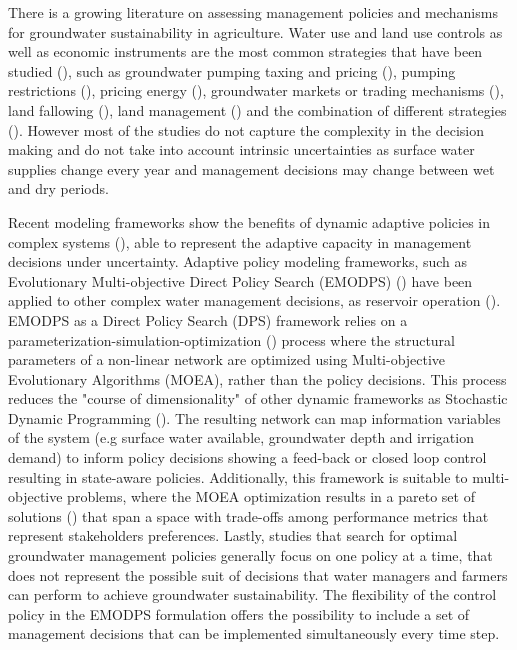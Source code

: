 \documentclass[11pt,a4paper]{article}
\begin{document}
There is a growing literature on assessing management policies and mechanisms for groundwater sustainability in agriculture. Water use and land use controls as well as economic instruments are the most common strategies that have been studied (\cite{clifton_water_2010}), such as groundwater pumping taxing and pricing (\cite{madani_exogenous_2013,mulligan_assessing_2014,stone_economic_2022}), pumping restrictions (\cite{young_hydrologic-economic_2021,lan_performance_2021,macewan_hydroeconomic_2017,rodriguez-flores_global_2022}), pricing energy (\cite{hrozencik_impacts_2022}), groundwater markets or trading mechanisms (\cite{khan_effect_2019,kuwayama_regulation_2013}), land fallowing (\cite{van_schmidt_linkages_2022}), land management (\cite{bourque_balancing_2019,li_evaluation_2018,bryant_shaping_2020}) and the combination of different strategies (\cite{graveline_combining_2019,hrozencik_heterogeneous_2017}). However most of the studies do not capture the complexity in the decision making  and do not take into account intrinsic uncertainties as surface water supplies change every year and management decisions may change between wet and dry periods. 

Recent modeling frameworks show the benefits of dynamic adaptive policies in complex systems (\cite{herman_climate_2020,walker_adapt_2013}), able to  represent the adaptive capacity in management decisions under uncertainty.  Adaptive policy modeling frameworks, such as Evolutionary Multi-objective Direct Policy Search (EMODPS) (\cite{giuliani_curses_2016,macian-sorribes_inferring_2020}) have been applied to other complex water management decisions, as reservoir operation  (\cite{zatarain_salazar_balancing_2017,gupta_can_2020}). EMODPS as a Direct Policy Search (DPS) framework relies on a parameterization-simulation-optimization (\cite{koutsoyiannis_evaluation_2003}) process where the structural parameters of a non-linear network are optimized using Multi-objective Evolutionary Algorithms (MOEA), rather than the policy decisions. This process reduces the "course of dimensionality" of other dynamic frameworks as Stochastic Dynamic Programming (\cite{taylor_dynamic_1993}). The resulting network can map information variables of the system (e.g surface water available, groundwater depth and irrigation demand) to inform policy decisions showing a feed-back or closed loop control resulting in state-aware policies. Additionally, this framework is suitable to multi-objective problems, where the MOEA optimization results in a pareto set of solutions (\cite{coello_evolutionary_2007}) that span a space with trade-offs among performance metrics that represent stakeholders preferences. Lastly, studies that search for optimal groundwater management policies generally focus on one policy at a time, that does not represent the possible suit of decisions that water managers and farmers can perform to achieve groundwater sustainability. The flexibility of the control policy in the EMODPS formulation offers the possibility to include a set of management decisions that can be implemented simultaneously every time step.
\end{document}

